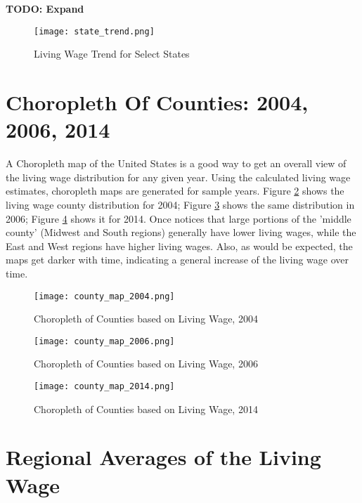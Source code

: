 \textbf{TODO: Expand}

\begin{figure}[hbt]
    \centering
        \texttt{[image: state\_trend.png]}
        \caption{Living Wage Trend for Select States}
    \label{f:ch4_state_trend}
\end{figure}



\section{Choropleth Of Counties: 2004, 2006, 2014}

A Choropleth map of the United States is a good way to get an overall view of the living wage distribution for any given year. Using the calculated living wage estimates, choropleth maps are generated for sample years. Figure \ref{f:ch4_county_map_2004} shows the living wage county distribution for 2004; Figure \ref{f:ch4_county_map_2006} shows the same distribution in 2006; Figure \ref{f:ch4_county_map_2014} shows it for 2014. Once notices that large portions of the 'middle county' (Midwest and South regions) generally have lower living wages, while the East and West regions have higher living wages. Also, as would be expected, the maps get darker with time, indicating a general increase of the living wage over time.


\begin{figure}[H]
    \centering
        \texttt{[image: county\_map\_2004.png]}
        \caption{Choropleth of Counties based on Living Wage, 2004}
    \label{f:ch4_county_map_2004}
\end{figure}

\begin{figure}[H]
    \centering
        \texttt{[image: county\_map\_2006.png]}
        \caption{Choropleth of Counties based on Living Wage, 2006}
    \label{f:ch4_county_map_2006}
\end{figure}

\begin{figure}[H]
    \centering
        \texttt{[image: county\_map\_2014.png]}
        \caption{Choropleth of Counties based on Living Wage, 2014}
    \label{f:ch4_county_map_2014}
\end{figure}




\section{Regional Averages of the Living Wage}

